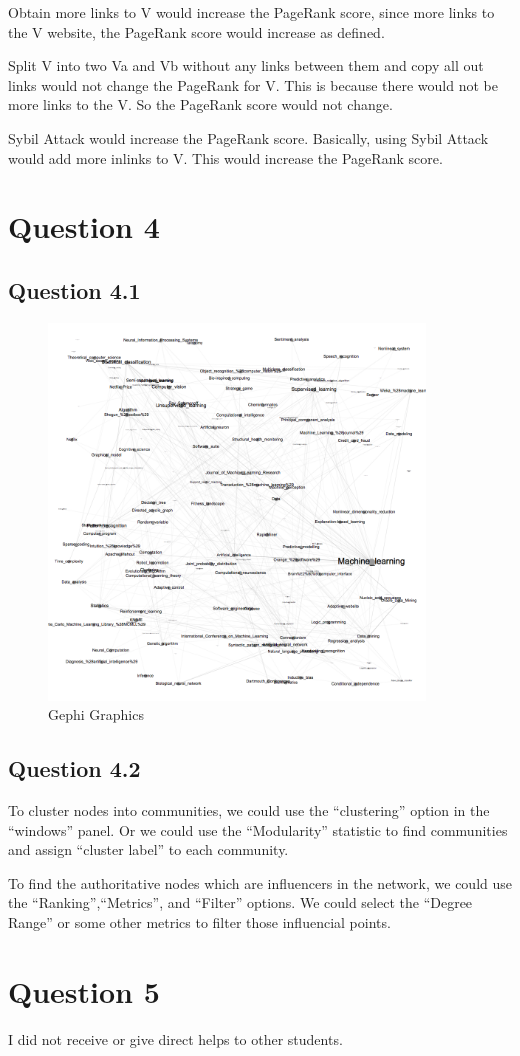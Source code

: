 \documentclass{article} %
\begin{document}
Obtain more links to V would increase the PageRank score, since more links to
the V website, the PageRank score would increase as defined.

Split V into two Va and Vb without any links between them and copy all out
links would not change the PageRank for V. This is because there would not be
more links to the V. So the PageRank score would not change.

Sybil Attack would increase the PageRank score. Basically, using Sybil Attack
would add more inlinks to V. This would increase the PageRank score.


\section{Question 4}


\subsection{Question 4.1}
\begin{figure}[h]
\begin{center}
\includegraphics[width=10cm]{pic/result.png}
\end{center}
\caption{Gephi Graphics}
\end{figure}

\subsection{Question 4.2}
To cluster nodes into communities, we could use the ``clustering'' option in the
``windows'' panel. Or we could use the ``Modularity'' statistic to find
communities and assign ``cluster label'' to each community.

To find the authoritative nodes which are influencers in the network, we could
use the ``Ranking'',``Metrics'', and ``Filter'' options. We could select the
``Degree Range'' or some other metrics to filter those influencial points.


\section{Question 5}
I did not receive or give direct helps to other students.
\end{document}
